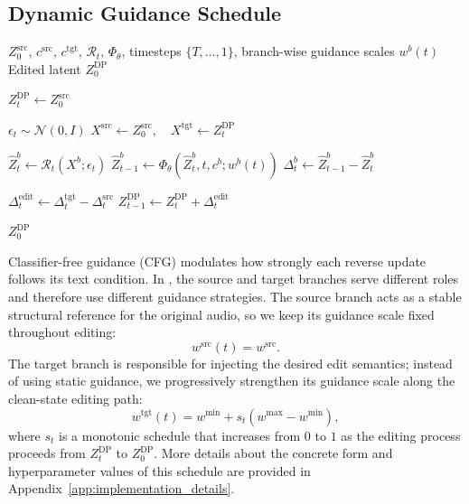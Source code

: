 \subsection{Dynamic Guidance Schedule}
\label{sec:guidance_scheduling}

\begin{algorithm}[t]
\caption{\ourmethod{}}
\label{alg:direct_audio_edit}
{\small
\begin{algorithmic}[1]
\Require $Z^{\mathrm{src}}_0$, $c^{\mathrm{src}}$, $c^{\mathrm{tgt}}$, $\mathcal{R}_t$, $\Phi_\theta$, timesteps $\{T,\ldots,1\}$, branch-wise guidance scales $w^b(t)$
\Ensure Edited latent $Z_0^{\text{DP}}$

\State $Z_t^{\text{DP}} \leftarrow Z^{\mathrm{src}}_0$ 

    \State $\epsilon_t \sim \mathcal{N}(0,I)$ 
    \State $X^{\mathrm{src}} \leftarrow Z^{\mathrm{src}}_0,\quad X^{\mathrm{tgt}} \leftarrow Z_t^{\text{DP}}$ 

        \State $\hat{Z}^b_t \leftarrow \mathcal{R}_t(X^b;\epsilon_t)$ 
        \State $\hat{Z}^b_{t-1} \leftarrow \Phi_\theta(\hat{Z}^b_t,t,c^b;w^b(t))$ 
        \State $\Delta^b_t \leftarrow \hat{Z}^b_{t-1}-\hat{Z}^b_t$ 
    \EndFor

    \State $\Delta^{\mathrm{edit}}_t \leftarrow \Delta^{\mathrm{tgt}}_t-\Delta^{\mathrm{src}}_t$ 
    \State $Z_{t-1}^{\text{DP}} \leftarrow Z_t^{\text{DP}}+\Delta^{\mathrm{edit}}_t$ 
\EndFor

\State \Return $Z_0^{\text{DP}}$

\end{algorithmic}
}
\end{algorithm}

Classifier-free guidance (CFG) \citep{ho2022classifierfree} modulates how strongly each reverse update follows its text condition.
In \ourmethod{}, the source and target branches serve different roles and therefore use different guidance strategies.
The source branch acts as a stable structural reference for the original audio, so we keep its guidance scale fixed throughout editing:
\begin{equation}
w^{\mathrm{src}}(t)=w^{\mathrm{src}} .
\end{equation}
The target branch is responsible for injecting the desired edit semantics; instead of using static guidance, we progressively strengthen its guidance scale along the clean-state editing path:
\begin{equation}
w^{\mathrm{tgt}}(t)
=
w^{\min}
+
s_t
\left(
w^{\max}-w^{\min}
\right),
\end{equation}
where $s_t$ is a monotonic schedule that increases from $0$ to $1$ as the editing process proceeds from $Z_t^{\text{DP}}$ to $Z_0^{\text{DP}}$.
More details about the concrete form and hyperparameter values of this schedule are provided in Appendix~\ref{app:implementation_details}.

